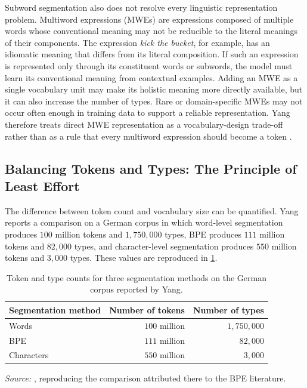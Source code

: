 Subword segmentation also does not resolve every linguistic representation problem. Multiword expressions (MWEs) are expressions composed of multiple words whose conventional meaning may not be reducible to the literal meanings of their components. The expression \emph{kick the bucket}, for example, has an idiomatic meaning that differs from its literal composition. If such an expression is represented only through its constituent words or subwords, the model must learn its conventional meaning from contextual examples. Adding an MWE as a single vocabulary unit may make its holistic meaning more directly available, but it can also increase the number of types. Rare or domain-specific MWEs may not occur often enough in training data to support a reliable representation. Yang therefore treats direct MWE representation as a vocabulary-design trade-off rather than as a rule that every multiword expression should become a token \parencite{yang2024rethinking}.

\subsection{Balancing Tokens and Types: The Principle of Least Effort}
\label{subsec:tokenizer-tokens-types-ple}

The difference between token count and vocabulary size can be quantified. Yang reports a comparison on a German corpus in which word-level segmentation produces \(100\) million tokens and \(1{,}750{,}000\) types, BPE produces \(111\) million tokens and \(82{,}000\) types, and character-level segmentation produces \(550\) million tokens and \(3{,}000\) types. These values are reproduced in \cref{tab:tokenizer-german-tradeoff}.

\begin{table}[htbp]
    \centering
    \caption{Token and type counts for three segmentation methods on the German corpus reported by Yang.}
    \label{tab:tokenizer-german-tradeoff}
    \begin{tabularx}{\textwidth}{Xrr}
        \toprule
        Segmentation method & Number of tokens & Number of types \\
        \midrule
        Words & \(100\) million & \(1{,}750{,}000\) \\
        BPE & \(111\) million & \(82{,}000\) \\
        Characters & \(550\) million & \(3{,}000\) \\
        \bottomrule
    \end{tabularx}
    \par
    \smallskip
    \footnotesize\emph{Source:} \textcite{yang2024rethinking}, reproducing the comparison attributed there to the BPE literature.
\end{table}

